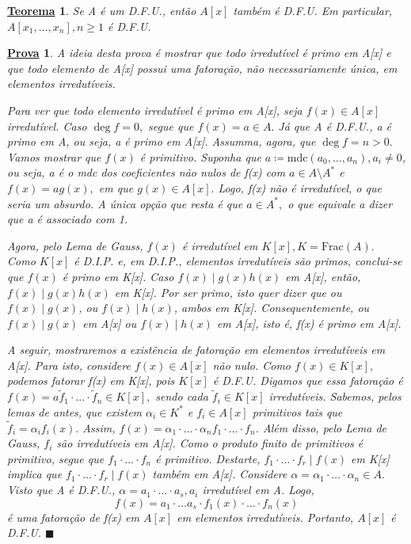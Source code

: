 \documentclass{article}
\newtheorem*{theorem*}{\underline{Teorema}}
\newtheorem*{proof*}{\underline{Prova}}
\renewcommand\qedsymbol{$\blacksquare$}
\begin{document}
    \begin{theorem*}
      Se A é um D.F.U., então \(A[x]\) também é D.F.U. Em particular, \(A[x_{1}, \dotsc , x_{n}], n\geq 1\) é D.F.U.
    \end{theorem*}
    \begin{proof*}
      A ideia desta prova é mostrar que todo irredutível é primo em A[x] e que todo elemento de A[x] possui uma fatoração, não necessariamente
      única, em elementos irredutíveis.

      Para ver que todo elemento irredutível é primo em A[x], seja \(f(x)\in A[x]\) irredutível. Caso \(\deg{f} = 0,\) segue que \(f(x) = a\in A.\) Já 
      que A é D.F.U., a é primo em A, ou seja, a é primo em A[x]. Assumma, agora, que \(\deg{f} = n > 0.\) Vamos mostrar que \(f(x)\) é primitivo. Suponha que
      \(a\coloneqq \mathrm{mdc}(a_{0}, \dotsc , a_{n}), a_{i}\neq 0\), ou seja, a é o mdc dos coeficientes não nulos de f(x) com \(a\in A\setminus{A^{*}} \) e
      \(f(x) = ag(x),\) em que \(g(x)\in A[x].\) Logo, f(x) não é irredutível, o que seria um absurdo. A única opção que resta é que \(a\in A^{*},\) o que equivale a dizer
      que a é associado com 1.

      Agora, pelo Lema de Gauss, \(f(x)\) é irredutível em \(K[x], K = \mathrm{Frac}(A).\) Como \(K[x]\) é D.I.P. e, em D.I.P., elementos irredutíveis são primos,
      conclui-se que \(f(x)\) é primo em K[x]. Caso \(f(x)\mid g(x)h(x)\) em A[x], então, \(f(x)\mid g(x)h(x)\) em K[x]. Por ser primo, isto quer dizer que ou
      \(f(x)\mid g(x)\), ou \(f(x)\mid h(x)\), ambos em K[x]. Consequentemente, ou \(f(x)\mid g(x)\) em A[x] ou \(f(x)\mid h(x)\) em A[x], isto é, f(x) é primo em A[x].

      A seguir, mostraremos a existência de fatoração em elementos irredutíveis em A[x]. Para isto, considere \(f(x)\in A[x]\) não nulo. Como \(f(x)\in K[x],\)
      podemos fatorar f(x) em K[x], pois \(K[x]\) é D.F.U. Digamos que essa fatoração é \(f(x) = a\tilde{f}_{1}\cdot \dotsc \cdot \tilde{f}_{n}\in K[x],\) sendo cada
      \(\tilde{f}_{i}\in K[x]\) irredutíveis. Sabemos, pelos lemas de antes, que existem \(\alpha_{i}\in K^{*}\) e \(f_{i}\in A[x]\) primitivos tais que \(\tilde{f}_{i} =
      \alpha_{i}f_{i}(x).\) Assim, \(f(x) = \alpha_{1}\cdot \dotsc \cdot \alpha_{n}f_{1}\cdot \dotsc \cdot f_{n}\). Além disso, pelo Lema de Gauss, \(f_{i}\) são irredutíveis
      em A[x]. Como o produto finito de primitivos é primitivo, segue que \(f_{1}\cdot \dotsc \cdot f_{n}\) é primitivo. Destarte, \(f_{1}\cdot \dotsc \cdot f_{r}\mid f(x)\)
      em K[x] implica que \(f_{1}\cdot \dotsc \cdot f_{r}\mid f(x)\) também em A[x]. Considere \(\alpha = \alpha _{1}\cdot \dotsc \cdot \alpha_{n}\in A.\) Visto que A é 
      D.F.U., \(\alpha = a_{1}\cdot \dotsc \cdot a_{s}, a_{i}\) irredutível em A. Logo, 
      \[
        f(x) = a_{1}\cdot \dotsc a_{s}\cdot f_{1}(x)\cdot \dotsc \cdot f_{n}(x)
      \]
      é uma fatoração de f(x) em \(A[x]\) em elementos irredutíveis. Portanto, \(A[x]\) é D.F.U. \qedsymbol
    \end{proof*}
\end{document}

